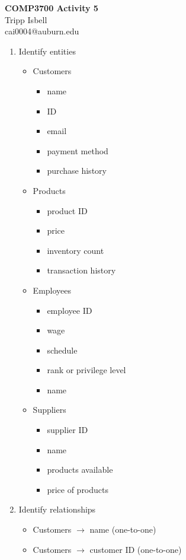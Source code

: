 \documentclass{letter}
\begin{document}
\begin{center}
\textbf{COMP3700 Activity 5}\\
Tripp Isbell\\
cai0004@auburn.edu
\end{center}

\begin{enumerate}
	\item Identify entities
	\begin{itemize}
		\item Customers
		\begin{itemize}
			\item name
			\item ID
			\item email
			\item payment method
			\item purchase history
		\end{itemize}
		\item Products
		\begin{itemize}
			\item product ID
			\item price
			\item inventory count
			\item transaction history
		\end{itemize}
		\item Employees
		\begin{itemize}
			\item employee ID
			\item wage
			\item schedule
			\item rank or privilege level
			\item name
		\end{itemize}
		\item Suppliers
		\begin{itemize}
			\item supplier ID
			\item name
			\item products available
			\item price of products
		\end{itemize}
	\end{itemize}
\newpage
	\item Identify relationships
	\begin{itemize}
		\item Customers $\longrightarrow$ name (one-to-one)
		\item Customers $\longrightarrow$ customer ID (one-to-one)

\end{itemize}
\end{enumerate}
\end{document}
